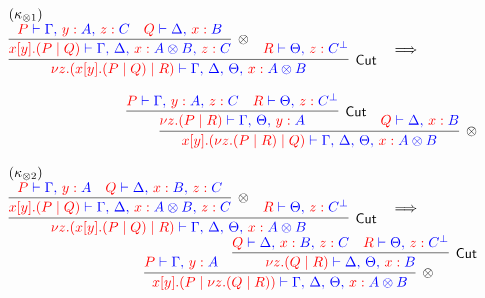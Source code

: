 \begin{figure*}
\[\colored
\begin{array}{c}

\multicolumn{1}{l}{(\kappa_{\otimes1})}\filler \\
\vcenter{
  \inference{
    \inference{
      \tm{P} \tpvdash \tp{\Gamma \comma \tmof{y}A \comma \tmof{z}C}
      &
      \tm{Q} \tpvdash \tp{\Delta \comma \tmof{x}B}
    }{\otimes}{
      \tm{x[y].(P \mid Q)} \tpvdash
        \tp{\Gamma \comma \Delta \comma \tmof{x}A \otimes B \comma \tmof{z}C}
    }
    &
    \tm{R} \tpvdash \tp{\Theta \comma \tmof{z}C^\bot}
  }{Cut}{
    \tm{\nu z\Of{C}.(x[y].(P \mid Q) \mid R)} \tpvdash
      \tp{\Gamma \comma \Delta \comma \Theta \comma \tmof{x}A \otimes B}
  }
}
\quad \becomes \hfill \\~\\
\hfill
\vcenter{
  \inference{
    \inference{
      \tm{P} \tpvdash \tp{\Gamma \comma \tmof{y}A \comma \tmof{z}C}
      &
      \tm{R} \tpvdash \tp{\Theta \comma \tmof{z}C^\bot}
    }{Cut}{
      \tm{\nu z\Of{C}.(P \mid R)} \tpvdash
        \tp{\Gamma \comma \Theta \comma \tmof{y}A}
    }
    &
    \tm{Q} \tpvdash \tp{\Delta \comma \tmof{x}B}
  }{\otimes}{
    \tm{x[y].(\nu z\Of{C}.(P \mid R) \mid Q)} \tpvdash
      \tp{\Gamma \comma \Delta \comma \Theta \comma \tmof{x}A \otimes B}
  }
}

\\~\\

\multicolumn{1}{l}{(\kappa_{\otimes2})} \\
\vcenter{
  \inference{
    \inference{
      \tm{P} \tpvdash \tp{\Gamma \comma \tmof{y}A}
      &
      \tm{Q} \tpvdash \tp{\Delta \comma \tmof{x}B \comma \tmof{z}C}
    }{\otimes}{
      \tm{x[y].(P \mid Q)} \tpvdash
        \tp{\Gamma \comma \Delta \comma \tmof{x}A \otimes B \comma \tmof{z}C}
    }
    &
    \tm{R} \tpvdash \tp{\Theta \comma \tmof{z}C^\bot}
  }{Cut}{
    \tm{\nu z\Of{C}.(x[y].(P \mid Q) \mid R)} \tpvdash
      \tp{\Gamma \comma \Delta \comma \Theta \comma \tmof{x}A \otimes B}
  }
}
\quad \becomes \hfill \\
\hfill
\vcenter{
  \inference{
    \tm{P} \tpvdash \tp{\Gamma \comma \tmof{y}A}
    &
    \inference{
      \tm{Q} \tpvdash \tp{\Delta \comma \tmof{x}B \comma \tmof{z}C}
      &
      \tm{R} \tpvdash \tp{\Theta \comma \tmof{z}C^\bot}
    }{Cut}{
      \tm{\nu z\Of{C}.(Q \mid R)} \tpvdash
        \tp{\Delta \comma \Theta \comma \tmof{x}B}
    }
  }{\otimes}{
    \tm{x[y].(P \mid \nu z\Of{C}.(Q \mid R))} \tpvdash
      \tp{\Gamma \comma \Delta \comma \Theta \comma \tmof{x}A \otimes B}
  }
}


\end{array}\]
\end{figure*}
